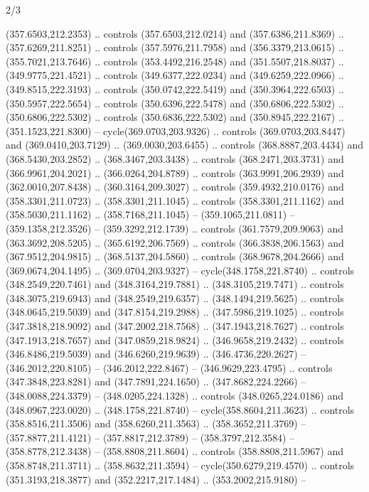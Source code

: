 \begin{flagdescription}{2/3}
\begin{scope}[xshift=0.5\flaglength,yshift=0.5\flagwidth,scale=\flagwidth/495.65]
\begin{scope}[y=0.8pt, x=0.8pt, yscale=-1,shift={(-463.76,-309.78)}]
  (357.6503,212.2353) .. controls (357.6503,212.0214) and (357.6386,211.8369) ..
  (357.6269,211.8251) .. controls (357.5976,211.7958) and (356.3379,213.0615) ..
  (355.7021,213.7646) .. controls (353.4492,216.2548) and (351.5507,218.8037) ..
  (349.9775,221.4521) .. controls (349.6377,222.0234) and (349.6259,222.0966) ..
  (349.8515,222.3193) .. controls (350.0742,222.5419) and (350.3964,222.6503) ..
  (350.5957,222.5654) .. controls (350.6396,222.5478) and (350.6806,222.5302) ..
  (350.6806,222.5302) .. controls (350.6836,222.5302) and (350.8945,222.2167) ..
  (351.1523,221.8300) -- cycle(369.0703,203.9326) .. controls
  (369.0703,203.8447) and (369.0410,203.7129) .. (369.0030,203.6455) .. controls
  (368.8887,203.4434) and (368.5430,203.2852) .. (368.3467,203.3438) .. controls
  (368.2471,203.3731) and (366.9961,204.2021) .. (366.0264,204.8789) .. controls
  (363.9991,206.2939) and (362.0010,207.8438) .. (360.3164,209.3027) .. controls
  (359.4932,210.0176) and (358.3301,211.0723) .. (358.3301,211.1045) .. controls
  (358.3301,211.1162) and (358.5030,211.1162) .. (358.7168,211.1045) --
  (359.1065,211.0811) -- (359.1358,212.3526) -- (359.3292,212.1739) .. controls
  (361.7579,209.9063) and (363.3692,208.5205) .. (365.6192,206.7569) .. controls
  (366.3838,206.1563) and (367.9512,204.9815) .. (368.5137,204.5860) .. controls
  (368.9678,204.2666) and (369.0674,204.1495) .. (369.0704,203.9327) --
  cycle(348.1758,221.8740) .. controls (348.2549,220.7461) and
  (348.3164,219.7881) .. (348.3105,219.7471) .. controls (348.3075,219.6943) and
  (348.2549,219.6357) .. (348.1494,219.5625) .. controls (348.0645,219.5039) and
  (347.8154,219.2988) .. (347.5986,219.1025) .. controls (347.3818,218.9092) and
  (347.2002,218.7568) .. (347.1943,218.7627) .. controls (347.1913,218.7657) and
  (347.0859,218.9824) .. (346.9658,219.2432) .. controls (346.8486,219.5039) and
  (346.6260,219.9639) .. (346.4736,220.2627) -- (346.2012,220.8105) --
  (346.2012,222.8467) -- (346.9629,223.4795) .. controls (347.3848,223.8281) and
  (347.7891,224.1650) .. (347.8682,224.2266) -- (348.0088,224.3379) --
  (348.0205,224.1328) .. controls (348.0265,224.0186) and (348.0967,223.0020) ..
  (348.1758,221.8740) -- cycle(358.8604,211.3623) .. controls
  (358.8516,211.3506) and (358.6260,211.3563) .. (358.3652,211.3769) --
  (357.8877,211.4121) -- (357.8817,212.3789) -- (358.3797,212.3584) --
  (358.8778,212.3438) -- (358.8808,211.8604) .. controls (358.8808,211.5967) and
  (358.8748,211.3711) .. (358.8632,211.3594) -- cycle(350.6279,219.4570) ..
  controls (351.3193,218.3877) and (352.2217,217.1484) .. (353.2002,215.9180) --

\end{scope}
\end{scope}
\end{flagdescription}
